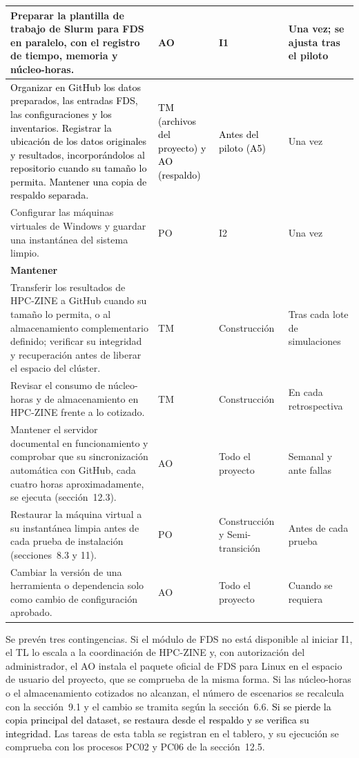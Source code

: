 \begin{longtable}{|p{}|p{}|p{}|p{}|}
\raggedright Preparar la plantilla de trabajo de Slurm para FDS en paralelo, con el registro de tiempo, memoria y núcleo-horas. & \raggedright AO & \raggedright I1 & \raggedright Una vez; se ajusta tras el piloto\tabularnewline\hline
\raggedright \textcolor{black}{Organizar en GitHub los datos preparados, las entradas FDS, las configuraciones y los inventarios. Registrar la ubicación de los datos originales y resultados, incorporándolos al repositorio cuando su tamaño lo permita. Mantener una copia de respaldo separada.} & \raggedright \textcolor{black}{TM (archivos del proyecto) y AO (respaldo)} & \raggedright \textcolor{black}{Antes del piloto (A5)} & \raggedright Una vez\tabularnewline\hline
\raggedright Configurar las máquinas virtuales de Windows y guardar una instantánea del sistema limpio. & \raggedright PO & \raggedright I2 & \raggedright Una vez\tabularnewline\hline
\multicolumn{4}{|l|}{\textbf{Mantener}}\tabularnewline\hline
\raggedright Transferir los resultados de HPC-ZINE a GitHub cuando su tamaño lo permita, o al almacenamiento complementario definido; verificar su integridad y recuperación antes de liberar el espacio del clúster. & \raggedright TM & \raggedright Construcción & \raggedright Tras cada lote de simulaciones\tabularnewline\hline
\raggedright Revisar el consumo de núcleo-horas y de almacenamiento en HPC-ZINE frente a lo cotizado. & \raggedright TM & \raggedright Construcción & \raggedright En cada retrospectiva\tabularnewline\hline
\raggedright Mantener el servidor documental en funcionamiento y comprobar que su sincronización automática con GitHub, cada cuatro horas aproximadamente, se ejecuta (sección~12.3). & \raggedright AO & \raggedright Todo el proyecto & \raggedright Semanal y ante fallas\tabularnewline\hline
\raggedright Restaurar la máquina virtual a su instantánea limpia antes de cada prueba de instalación (secciones~8.3 y 11). & \raggedright PO & \raggedright Construcción y Semi-transición & \raggedright Antes de cada prueba\tabularnewline\hline
\raggedright Cambiar la versión de una herramienta o dependencia solo como cambio de configuración aprobado. & \raggedright AO & \raggedright Todo el proyecto & \raggedright Cuando se requiera\tabularnewline\hline
\end{longtable}
 
Se prevén tres contingencias. Si el módulo de FDS no está disponible al iniciar I1, el TL lo escala a la coordinación de HPC-ZINE y, con autorización del administrador, el AO instala el paquete oficial de FDS para Linux en el espacio de usuario del proyecto, que se comprueba de la misma forma. Si las núcleo-horas o el almacenamiento cotizados no alcanzan, el número de escenarios se recalcula con la sección~9.1 y el cambio se tramita según la sección~6.6. \textcolor{black}{Si se pierde la copia principal \textcolor{black}{del dataset}, se restaura desde el respaldo y se verifica su integridad.} Las tareas de esta tabla se registran en el tablero, y su ejecución se comprueba con los procesos PC02 y PC06 de la sección~12.5.
